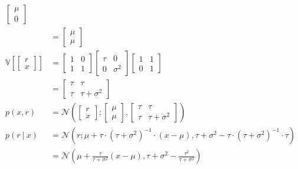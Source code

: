 \documentclass[a4paper, 12pt]{article}
\begin{document}
\begin{align}
\begin{bmatrix}
                        \mu \\ 0
                    \end{bmatrix} \\
                    & = \begin{bmatrix}
                        \mu \\ \mu
                    \end{bmatrix} \\
                    \mathbb{V}\left[\begin{bmatrix}
                        r \\ x
                    \end{bmatrix}\right] & = \begin{bmatrix}
                        1 & 0 \\
                        1 & 1
                    \end{bmatrix} \begin{bmatrix}
                        \tau & 0 \\
                        0 & \sigma^2
                    \end{bmatrix} \begin{bmatrix}
                        1 & 1 \\
                        0 & 1
                    \end{bmatrix} \\
                    & = \begin{bmatrix}
                        \tau & \tau \\
                        \tau & \tau + \sigma^2
                    \end{bmatrix} \\
                    p(x, r) & = \mathcal{N}\left(\begin{bmatrix}
                        r \\ x
                    \end{bmatrix}; \begin{bmatrix}
                        \mu \\ \mu
                    \end{bmatrix}, \begin{bmatrix}
                        \tau & \tau \\
                        \tau & \tau + \sigma^2
                    \end{bmatrix}\right) \\
                    p(r\ |\ x) & = \mathcal{N}(r; \mu + \tau \cdot (\tau + \sigma^2)^{-1} \cdot (x - \mu), \tau + \sigma^2 - \tau \cdot (\tau + \sigma^2)^{-1} \cdot \tau) \\
                    & = \mathcal{N}\left(\mu + \frac{\tau}{\tau + \sigma^2}(x - \mu), \tau + \sigma^2 - \frac{\tau^2}{\tau + \sigma^2}\right)
                \end{align}
\end{document}
